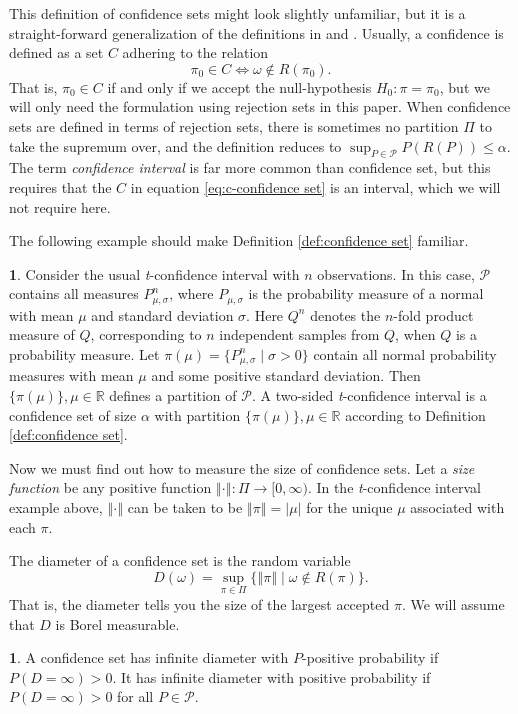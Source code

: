 \documentclass[article]{ajs}
\numberwithin{equation}{section}
\numberwithin{figure}{section}
\theoremstyle{plain}
\theoremstyle{definition}
\newtheorem{defn}[thm]{\protect\definitionname}
\theoremstyle{definition}
\newtheorem{example}[thm]{\protect\examplename}
\theoremstyle{plain}
\providecommand{\definitionname}{Definition}
\providecommand{\examplename}{Example}
\begin{document}
This definition of confidence sets might look slightly unfamiliar,
but it is a straight-forward generalization of the definitions in
\citet[Definition 9.1.5]{Casella2002-lg} and \citet[Section 3.5]{lehmann2006testing}.
Usually, a confidence is defined as a set $C$ adhering to the relation
\begin{equation}
\pi_{0}\in C\iff\omega\notin R(\pi_{0}).\label{eq:c-confidence set}
\end{equation}
That is, $\pi_{0}\in C$ if and only if we accept the null-hypothesis
$H_{0}:\pi=\pi_{0}$, but we will only need the formulation using rejection
sets in this paper. When confidence sets are defined in terms of rejection
sets, there is sometimes no partition $\Pi$ to take the supremum
over, and the definition reduces to $\sup_{P\in\mathcal{P}}P(R(P))\leq\alpha$.
The term\emph{ confidence interval} is far more common than confidence
set, but this requires that the $C$ in equation \ref{eq:c-confidence set}
is an interval, which we will not require here.

The following example should make Definition \ref{def:confidence set}
familiar.
\begin{example}
\label{exa:t-test} Consider the usual \emph{t}-confidence interval
with $n$ observations. In this case, $\mathcal{P}$ contains all measures
$P_{\mu,\sigma}^{n}$, where $P_{\mu,\sigma}$ is the probability
measure of a normal with mean $\mu$ and standard deviation $\sigma$.
Here $Q^{n}$ denotes the $n$-fold product measure of $Q$, corresponding to $n$ independent samples from $Q$, when $Q$ is a probability measure. Let $\pi(\mu)=\{P_{\mu,\sigma}^{n}\mid\sigma>0\}$
contain all normal probability measures with mean $\mu$ and some
positive standard deviation. Then $\{\pi(\mu)\},\mu\in\mathbb{R}$
defines a partition of $\mathcal{P}$. A two-sided \emph{t}-confidence
interval is a confidence set of size $\alpha$ with partition $\{\pi(\mu)\},\mu\in\mathbb{R}$
according to Definition \ref{def:confidence set}.
\end{example}

Now we must find out how to measure the size of confidence sets. Let
a \emph{size function} be any positive function $\left\Vert \cdot\right\Vert :\Pi\to[0,\infty)$.
In the \emph{t}-confidence interval example above, $\left\Vert \cdot\right\Vert $
can be taken to be $\left\Vert \pi\right\Vert =|\mu|$ for the unique
$\mu$ associated with each $\pi$. 

The diameter of a confidence set is the random variable
\begin{equation}
D(\omega)=\sup_{\pi\in\Pi}\{\left\Vert \pi\right\Vert \mid\omega\notin R(\pi)\}.\label{eq:diameter}
\end{equation}
That is, the diameter tells you the size of the largest accepted $\pi$.
We will assume that $D$ is Borel measurable.
\begin{defn}
\label{def:infinite diameter}A confidence set has infinite diameter
with $P$-positive probability if $P(D=\infty)>0$. It has infinite
diameter with positive probability if $P(D=\infty)>0$ for all $P\in\mathcal{P}$.
\end{defn}
\end{document}
